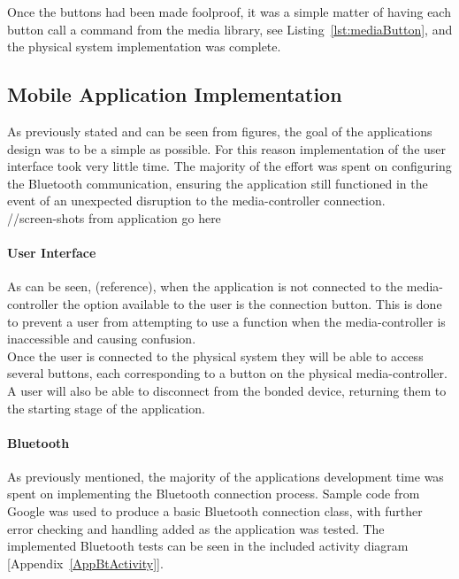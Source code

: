 \documentclass{article}
\begin{document}
			Once the buttons had been made foolproof, it was a simple matter of having each button call a command from the media library, see Listing~\ref{lst:mediaButton}, and the physical system implementation was complete. 
			
			
									
		\subsection{Mobile Application Implementation}
			As previously stated and can be seen from figures, the goal of the applications design was to be a simple as possible. For this reason implementation of the user interface took very little time. The majority of the effort was spent on configuring the Bluetooth communication, ensuring the application still functioned in the event of an unexpected disruption to the media-controller connection.\\
			
			\noindent
			//screen-shots from application go here
			
			\paragraph{User Interface}
			As can be seen, (reference), when the application is not connected to the media-controller the option available to the user is the connection button. This is done to prevent a user from attempting to use a function when the media-controller is inaccessible and causing confusion.\\
					
			Once the user is connected to the physical system they will be able to access several buttons, each corresponding to a button on the physical media-controller. A user will also be able to disconnect from the bonded device, returning them to the starting stage of the application.
			
			\paragraph{Bluetooth}
			As previously mentioned, the majority of the applications development time was spent on implementing the Bluetooth connection process. Sample code from Google \cite{GoogleBluetooth:online} was used to produce a basic Bluetooth connection class, with further error checking and handling added as the application was tested. The implemented Bluetooth tests can be seen in the included activity diagram [Appendix~\ref{AppBtActivity}].
			
\end{document}
